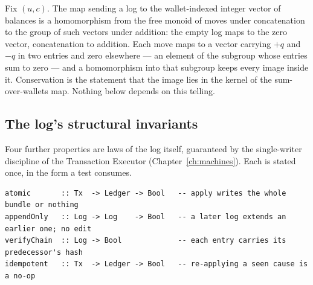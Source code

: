 \begin{secondtelling}
Fix $(u,c)$. The map sending a log to the wallet-indexed integer vector of
balances is a homomorphism from the free monoid of moves under concatenation to
the group of such vectors under addition: the empty log maps to the zero vector,
concatenation to addition. Each move maps to a vector carrying $+q$ and $-q$ in
two entries and zero elsewhere --- an element of the subgroup whose entries sum to
zero --- and a homomorphism into that subgroup keeps every image inside it.
Conservation is the statement that the image lies in the kernel of the
sum-over-wallets map. Nothing below depends on this telling.
\end{secondtelling}

\subsection{The log's structural invariants}

Four further properties are laws of the log itself, guaranteed by the
single-writer discipline of the Transaction Executor (Chapter~\ref{ch:machines}).
Each is stated once, in the form a test consumes.

\begin{lstlisting}
atomic       :: Tx  -> Ledger -> Bool   -- apply writes the whole bundle or nothing
appendOnly   :: Log -> Log    -> Bool   -- a later log extends an earlier one; no edit
verifyChain  :: Log -> Bool             -- each entry carries its predecessor's hash
idempotent   :: Tx  -> Ledger -> Bool   -- re-applying a seen cause is a no-op
\end{lstlisting}

